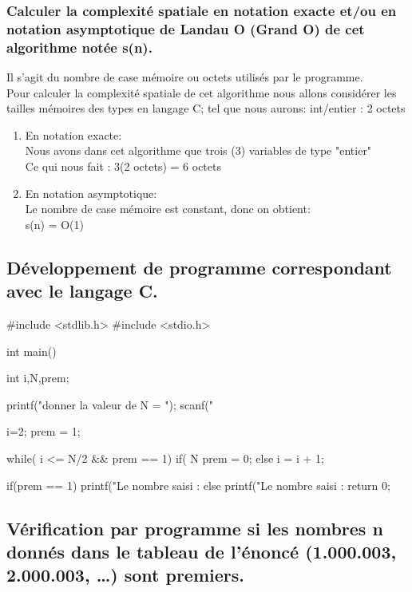 \documentclass[12pt]{article}
\begin{document}
\subsubsection{Calculer la complexité spatiale en notation exacte et/ou en notation asymptotique de Landau O (Grand O) de  cet  algorithme notée s(n).}
Il s'agit du nombre de case mémoire ou octets utilisés par le programme.
\\
Pour calculer la complexité spatiale de cet algorithme nous allons considérer les tailles mémoires des types en langage C; tel que nous aurons:
int/entier : 2 octets
\\
\begin{enumerate}
	\item En notation exacte:
	\\
Nous avons dans cet algorithme que trois (3) variables de type "entier"
\\
Ce qui nous fait :
\color{blue}
 3(2 octets) = 6 octets
\color{black}
\\
 
	\item En notation asymptotique:
	\\
	Le nombre de case mémoire est constant, donc on obtient:
	\\
	\color{blue}
	s(n) = O(1)
	\color{black}
	
	
\end{enumerate}


\subsection{Développement de programme correspondant avec le langage C.}


\begin{sql}
#include <stdlib.h>
#include <stdio.h>

int main()
{
	int i,N,prem;

	printf("donner la valeur de N = ");
	scanf("%

	i=2;
	prem = 1;

	while( i <= N/2 && prem == 1){
		if( N%
			prem = 0;
		else
			i = i + 1;
	}

	if(prem == 1)
    {
        printf("Le nombre saisi : %
    }
	else{
        printf("Le nombre saisi : %
	}
return 0;
}
\end{sql}



\subsection{Vérification par programme  si  les  nombres  n  donnés  dans  le tableau de l'énoncé (1.000.003, 2.000.003, …) sont premiers.}
\end{document}
